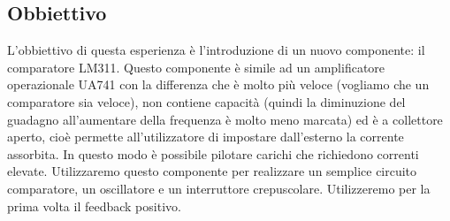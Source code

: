 \subsection{Obbiettivo}

L'obbiettivo di questa esperienza è l'introduzione di un nuovo componente:
il comparatore LM311. Questo componente è simile ad un amplificatore
operazionale UA741 con la differenza che è molto più veloce (vogliamo che un
comparatore sia veloce), non contiene capacità (quindi la diminuzione del
guadagno all'aumentare della frequenza è molto meno marcata) ed è a collettore aperto,
cioè permette all'utilizzatore di impostare dall'esterno la corrente assorbita.
In questo modo è possibile pilotare carichi che richiedono correnti elevate. Utilizzaremo
questo componente per realizzare un semplice circuito comparatore, un
oscillatore e un interruttore crepuscolare. Utilizzeremo per la prima volta
il feedback positivo.
